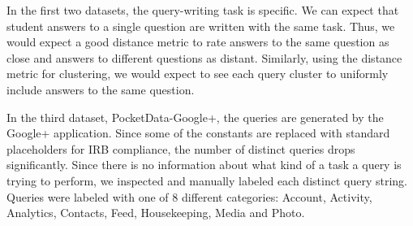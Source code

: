 
In the first two datasets, the query-writing task is specific.
We can expect that student answers to a single question are written with the same task.
Thus, we would expect a good distance metric to rate answers to the same question as close and answers to different questions as distant.
Similarly, using the distance metric for clustering, we would expect to see each query cluster to uniformly include answers to the same question.

In the third dataset, PocketData-Google+, the queries are generated by the Google+ application. Since some of the constants are replaced with standard placeholders for IRB compliance, the number of distinct queries drops significantly. Since there is no information about what kind of a task a query is trying to perform, we inspected and manually labeled each distinct query string. Queries were labeled with one of 8 different categories: Account, Activity, Analytics, Contacts, Feed, Housekeeping, Media and Photo.

